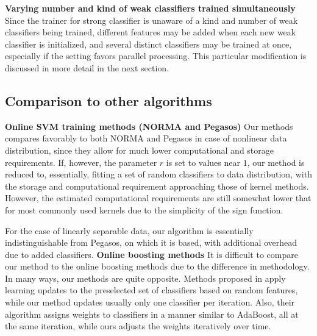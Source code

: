 {\bf Varying number and kind of weak classifiers trained simultaneously}  Since the trainer for strong classifier is unaware of a kind and number of weak classifiers being trained, different features may be added when each new weak classifier is initialized, and several distinct classifiers may be trained at once, especially if the setting favors parallel processing. 
This particular modification  is discussed in more detail in the next section.


\subsection{Comparison to other algorithms}
{\bf Online SVM training methods (NORMA and Pegasos)}
Our methods compares favorably to both NORMA and Pegasos in case of nonlinear data distribution, since they allow for much lower computational and storage requirements. If, however, the parameter $r$ is set to values near $1$, our method is reduced to, essentially, fitting a set of random classifiers to data distribution, with the storage and computational requirement approaching those of kernel methods. However, the estimated computational requirements are still somewhat lower that for most commonly used kernels due to the simplicity of the sign function. 

For the case of linearly separable data, our algorithm is essentially indistinguishable from Pegasos, on which it is based, with additional overhead due to added classifiers.
{\bf Online boosting methods}
It is difficult to compare our method to the online boosting methods due to the difference in methodology. In many ways, our methods are quite opposite. Methods proposed in \cite{OnlineBoost} apply learning updates to the preselected set of classifiers based on random features, while our method updates usually only one classifier per iteration. Also, their algorithm assigns weights to classifiers in a manner similar to AdaBoost, all at the same iteration, while ours adjusts the weights iteratively over time. 












